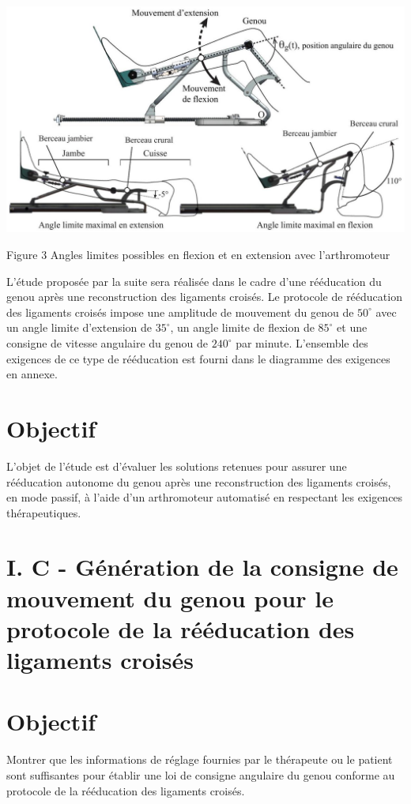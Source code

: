 \documentclass[10pt]{article}
\begin{document}
\begin{center}
\includegraphics[max width=\textwidth]{2024_07_14_a83aebba33898893d39fg-02}
\end{center}

Figure 3 Angles limites possibles en flexion et en extension avec l'arthromoteur

L'étude proposée par la suite sera réalisée dans le cadre d'une rééducation du genou après une reconstruction des ligaments croisés. Le protocole de rééducation des ligaments croisés impose une amplitude de mouvement du genou de $50^{\circ}$ avec un angle limite d'extension de $35^{\circ}$, un angle limite de flexion de $85^{\circ}$ et une consigne de vitesse angulaire du genou de $240^{\circ}$ par minute. L'ensemble des exigences de ce type de rééducation est fourni dans le diagramme des exigences en annexe.

\section*{Objectif}
L'objet de l'étude est d'évaluer les solutions retenues pour assurer une rééducation autonome du genou après une reconstruction des ligaments croisés, en mode passif, à l'aide d'un arthromoteur automatisé en respectant les exigences thérapeutiques.

\section*{I. C - Génération de la consigne de mouvement du genou pour le protocole de la rééducation des ligaments croisés}
\section*{Objectif}
Montrer que les informations de réglage fournies par le thérapeute ou le patient sont suffisantes pour établir une loi de consigne angulaire du genou conforme au protocole de la rééducation des ligaments croisés.
\end{document}

